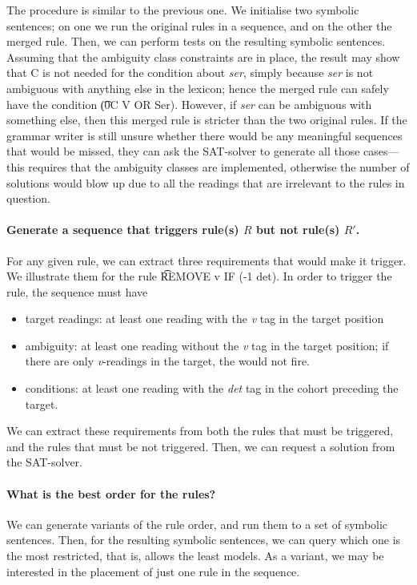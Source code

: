 {{The procedure is similar to the previous one. We initialise two symbolic sentences; on one we run the original rules in a sequence, and on the other the merged rule. 
Then, we can perform tests on the resulting symbolic sentences. Assuming that the ambiguity class constraints are in place, the result may show that C is not needed for the condition about {\em ser}, simply because {\em ser} is not ambiguous with anything else in the lexicon; hence the merged rule can safely have the condition \t{(0C V OR Ser)}. However, if {\em ser} can be ambiguous with something else, then this merged rule is stricter than the two original rules. If the grammar writer is still unsure whether there would be any meaningful sequences that would be missed, they can ask the SAT-solver to generate all those cases---this requires that the ambiguity classes are implemented, 
otherwise the number of solutions would blow up due to all the readings that are irrelevant to the rules in question.

\paragraph{Generate a sequence that triggers rule(s) $R$ but not rule(s) $R'$.}
For any given rule, we can extract three requirements that would make it trigger. We illustrate them for the rule \t{REMOVE v IF (-1 det)}. In order to trigger the rule, the sequence must have
\begin{itemize}
\item target readings: at least one reading with the \emph{v} tag in the target position
\item ambiguity: at least one reading without the \emph{v} tag in the target position; if there are only \emph{v}-readings in the target, the would not fire.
\item conditions: at least one reading with the \emph{det} tag in the cohort preceding the target.
\end{itemize}

We can extract these requirements from both the rules that must be triggered, and the rules that must be not triggered. Then, we can request a solution from the SAT-solver.

\paragraph{What is the best order for the rules?}
We can generate variants of the rule order, and run them to a set of symbolic sentences. Then, for the resulting symbolic sentences, we can query which one is the most restricted, that is, allows the least models.
As a variant, we may be interested in the placement of just one rule in the sequence.

}}
